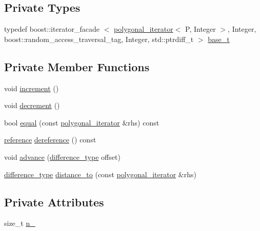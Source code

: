 \subsection*{\-Private \-Types}
\begin{DoxyCompactItemize}
\item 
typedef boost\-::iterator\-\_\-facade\*
$<$ \hyperlink{classyuh_1_1range__detail_1_1polygonal__iterator}{polygonal\-\_\-iterator}$<$ \-P, \*
\-Integer $>$, \-Integer, \*
boost\-::random\-\_\-access\-\_\-traversal\-\_\-tag, \*
\-Integer, std\-::ptrdiff\-\_\-t $>$ \hyperlink{classyuh_1_1range__detail_1_1polygonal__iterator_acd43edf91ede982ba924e46c01501792}{base\-\_\-t}
\end{DoxyCompactItemize}
\subsection*{\-Private \-Member \-Functions}
\begin{DoxyCompactItemize}
\item 
void \hyperlink{classyuh_1_1range__detail_1_1polygonal__iterator_aeb2624c7a86b765725fd80cd426e147d}{increment} ()
\item 
void \hyperlink{classyuh_1_1range__detail_1_1polygonal__iterator_af998f1201f6ff5160003144e5818b8ba}{decrement} ()
\item 
bool \hyperlink{classyuh_1_1range__detail_1_1polygonal__iterator_a033c7db3c22772fbc55a9a1048ad4c2d}{equal} (const \hyperlink{classyuh_1_1range__detail_1_1polygonal__iterator}{polygonal\-\_\-iterator} \&rhs) const 
\item 
\hyperlink{classyuh_1_1range__detail_1_1polygonal__iterator_aa5d67140d1557795cc6c30a2849d4e05}{reference} \hyperlink{classyuh_1_1range__detail_1_1polygonal__iterator_a1b739c629ff6d9f19e13216adc65a999}{dereference} () const 
\item 
void \hyperlink{classyuh_1_1range__detail_1_1polygonal__iterator_a0b477ad04db9bc38c85d68245b9886e5}{advance} (\hyperlink{classyuh_1_1range__detail_1_1polygonal__iterator_a9ac6039762e1b262cecb98589ffc1d75}{difference\-\_\-type} offset)
\item 
\hyperlink{classyuh_1_1range__detail_1_1polygonal__iterator_a9ac6039762e1b262cecb98589ffc1d75}{difference\-\_\-type} \hyperlink{classyuh_1_1range__detail_1_1polygonal__iterator_a871337725d96f0d971db5082f14fecf1}{distance\-\_\-to} (const \hyperlink{classyuh_1_1range__detail_1_1polygonal__iterator}{polygonal\-\_\-iterator} \&rhs)
\end{DoxyCompactItemize}
\subsection*{\-Private \-Attributes}
\begin{DoxyCompactItemize}
\item 
size\-\_\-t \hyperlink{classyuh_1_1range__detail_1_1polygonal__iterator_a27fd4ef0d3621da512b437dbe4210464}{n\-\_\-}
\end{DoxyCompactItemize}
